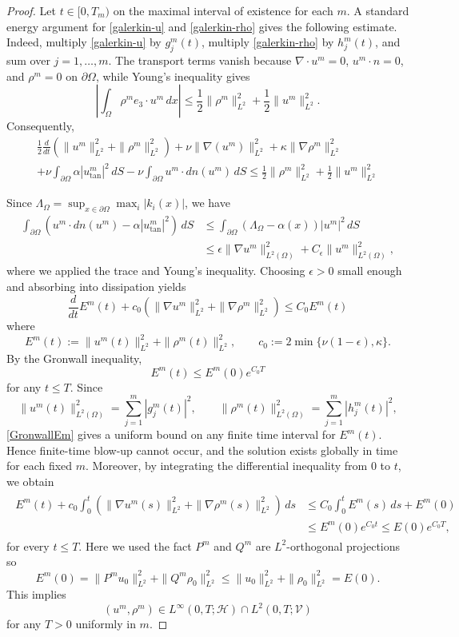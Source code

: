 \documentclass[11pt,reqno]{amsart}
\theoremstyle{plain}
\numberwithin{equation}{section}
\newcommand{\tanproj}{\text{tan}}
\begin{document}
\begin{proof}
Let $t\in [0,T_m)$ on the maximal interval of existence for each $m$. A standard energy argument for \eqref{galerkin-u} and \eqref{galerkin-rho} gives the following estimate. Indeed, multiply \eqref{galerkin-u} by \(g_j^m(t)\),
multiply \eqref{galerkin-rho} by \(h_j^m(t)\), and sum over
\(j=1,\ldots,m\). The transport terms vanish because
\(\nabla\cdot u^m=0\), \(u^m\cdot n=0\), and \(\rho^m=0\) on
\(\partial\Omega\), while Young's inequality gives
\[
\left|\int_\Omega \rho^m e_3\cdot u^m\,dx\right|
\le \frac12\|\rho^m\|_{L^2}^2+\frac12\|u^m\|_{L^2}^2.
\]
Consequently,
\begin{multline*}
\frac{1}{2} \frac{d}{dt}
\left(
\|u^m\|_{L^2}^2+\|\rho^m\|_{L^2}^2
\right)
+\nu\|\nabla(u^m)\|_{L^2}^2
+\kappa\|\nabla\rho^m\|_{L^2}^2  \\
+\nu\int_{\partial\Omega}\alpha |u^m_{\tanproj}|^2\,dS
-\nu\int_{\partial\Omega}u^m\cdot dn(u^m)\,dS
\le \frac12\|\rho^m\|_{L^2}^2+\frac12\|u^m\|_{L^2}^2
\end{multline*}

Since $\Lambda_\Omega=\sup_{x\in\partial\Omega}\max_i|k_i(x)|$, we have
\[
\begin{aligned}
\int_{\partial\Omega}\left(u^m\cdot dn(u^m)-\alpha |u^m_{\tanproj}|^2\right)\,dS
&\le\int_{\partial\Omega}\left(\Lambda_\Omega-\alpha(x)\right)|u^m|^2\,dS \\
&\le\epsilon\|\nabla u^m\|^2_{L^2(\Omega)}+C_\epsilon\|u^m\|^2_{L^2(\Omega)},
\end{aligned}
\]
where we applied the trace and Young's inequality.
Choosing $\epsilon>0$ small enough and absorbing into dissipation yields 
\[
\frac{d}{dt}E^m(t)+c_0(\|\nabla u^m\|^2_{L^2}+\|\nabla\rho^m\|_{L^2}^2)\le C_0E^m(t)
\]
where
\[
E^m(t):=\|u^m(t)\|^2_{L^2}+\|\rho^m(t)\|^2_{L^2},
\qquad
c_0:=2\min\{\nu(1-\epsilon),\kappa\}.
\]
By the Gronwall inequality,
\begin{equation}\label{GronwallEm}
E^m(t)\le E^m(0)e^{C_0T}
\end{equation}
for any $t\le T$.
Since
\[
\|u^m(t)\|^2_{L^2(\Omega)}
=\sum_{j=1}^m |g_j^m(t)|^2,
\qquad
\|\rho^m(t)\|^2_{L^2(\Omega)}
=\sum_{j=1}^m |h_j^m(t)|^2,
\]
\eqref{GronwallEm} gives a uniform bound on any finite time interval for $E^m(t)$. Hence finite-time blow-up cannot occur, and the solution exists globally in time for each fixed $m$. Moreover, by integrating the differential inequality from $0$ to $t$, we obtain
\begin{align}\label{energybond}
\begin{split}
E^m(t)+c_0\int_0^t\left(\|\nabla u^m(s)\|^2_{L^2}+\|\nabla\rho^m(s)\|_{L^2}^2\right)\,ds
&\le C_0\int_0^tE^m(s)\,ds+E^m(0)\\
&\le E^m(0)e^{C_0t}\le E(0)e^{C_0T},
\end{split}
\end{align}
for every $t\le T$. Here we used the fact $P^m$ and $Q^m$ are $L^2$-orthogonal projections so
\[
E^m(0)=\|P^m u_0\|^2_{L^2}+\|Q^m\rho_0\|^2_{L^2}
\le \|u_0\|^2_{L^2}+\|\rho_0\|^2_{L^2}=E(0).
\]
This implies
\[
({u}^m,\rho^m)\in L^\infty(0,T;\mathcal H)\cap L^2(0,T;\mathcal V)
\]
for any $T>0$ uniformly in \(m\). 


\end{proof}
\end{document}
